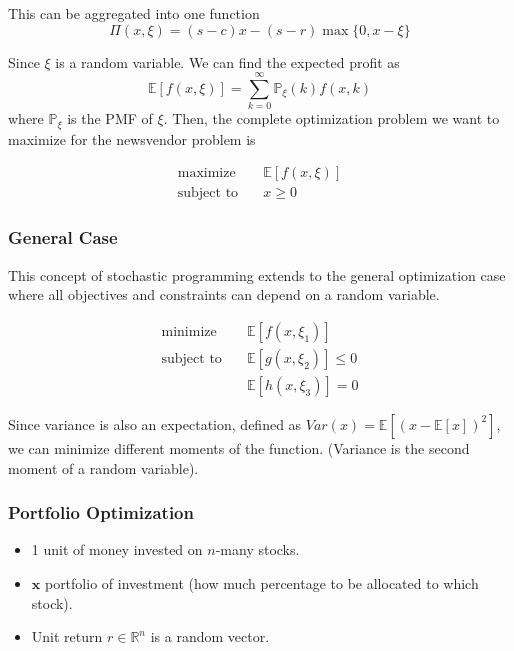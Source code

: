 This can be aggregated into one function 
\begin{equation}
  \Pi(x,\xi) = (s-c)x - (s-r) \max \{ 0, x-\xi \}
\end{equation}

Since $\xi$ is a random variable. We can find the expected profit as
\begin{equation}
  \mathbb{E}[f(x,\xi)] = \sum_{k=0}^\infty \mathbb{P}_\xi (k) f(x,k)
\end{equation}
where $\mathbb{P}_\xi$ is the PMF of $\xi$. Then, the complete optimization problem we want to maximize for the newsvendor problem is

\begin{align}
  \text{maximize} & \quad \mathbb{E}[f(x,\xi)] \\
  \text{subject to} & \quad x \geq 0
\end{align}

\subsubsection{General Case}

This concept of stochastic programming extends to the general optimization case where all objectives and constraints can depend on a random variable.

\begin{align}
  \text{minimize} & \quad \mathbb{E}[f(x,\xi_1)] \\
  \text{subject to} & \quad \mathbb{E}[g(x,\xi_2)] \leq 0\\
  & \quad \mathbb{E}[h(x,\xi_3)] = 0
\end{align}

Since variance is also an expectation, defined as $Var(x) = \mathbb{E}[(x-\mathbb{E}[x])^2]$, we can minimize different moments of the function. (Variance is the second moment of a random variable).

\subsubsection{Portfolio Optimization}
\begin{itemize}
  \item 1 unit of money invested on $n$-many stocks.
  \item $\textbf{x}$ portfolio of investment (how much percentage to be allocated to which stock).
  \item Unit return $r \in \mathbb{R}^n$ is a random vector.
\end{itemize}

